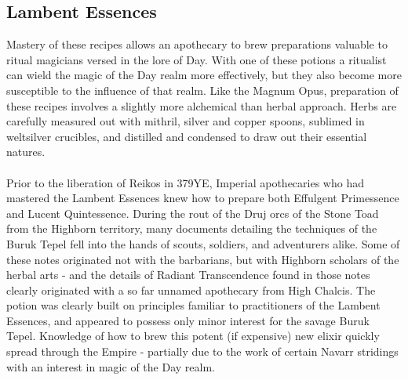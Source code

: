 \documentclass[a5paper,pagesize,10pt,bibtotoc,pointlessnumbers,
normalheadings,DIV=9,twoside=false]{scrbook}
\newcommand\mychapter[2]{
    \topskip0pt
    \vspace*{\fill}
    \begin{it}
    \chapter{#1}
        #2
    \end{it}
    \vspace*{\fill}
    \newpage
}
\begin{document}
\mychapter{Lambent Essences}{
    Mastery of these recipes allows an apothecary to brew preparations valuable to ritual magicians versed in the lore of Day. With one of these potions a ritualist can wield the magic of the Day realm more effectively, but they also become more susceptible to the influence of that realm. Like the Magnum Opus, preparation of these recipes involves a slightly more alchemical than herbal approach. Herbs are carefully measured out with mithril, silver and copper spoons, sublimed in weltsilver crucibles, and distilled and condensed to draw out their essential natures.\\\\Prior to the liberation of Reikos in 379YE, Imperial apothecaries who had mastered the Lambent Essences knew how to prepare both Effulgent Primessence and Lucent Quintessence. During the rout of the Druj orcs of the Stone Toad from the Highborn territory, many documents detailing the techniques of the Buruk Tepel fell into the hands of scouts, soldiers, and adventurers alike. Some of these notes originated not with the barbarians, but with Highborn scholars of the herbal arts - and the details of Radiant Transcendence found in those notes clearly originated with a so far unnamed apothecary from High Chalcis. The potion was clearly built on principles familiar to practitioners of the Lambent Essences, and appeared to possess only minor interest for the savage Buruk Tepel. Knowledge of how to brew this potent (if expensive) new elixir quickly spread through the Empire - partially due to the work of certain Navarr stridings with an interest in magic of the Day realm.
}
\end{document}

